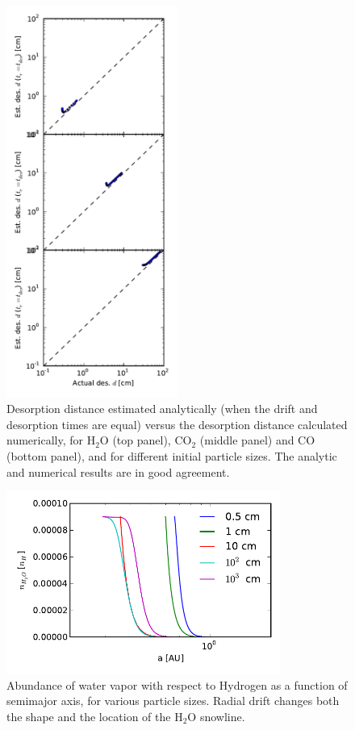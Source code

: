 \documentclass[12pt, preprint]{aastex}
\begin{document}
\begin{figure}[htb]
\centering
\includegraphics[width=0.5\textwidth]{figs/desorption_distance_actual_vs_estimated.pdf}
\caption{Desorption distance estimated analytically (when the drift and desorption times are equal) versus the desorption distance calculated numerically, for H$_2$O (top panel), CO$_2$ (middle panel) and CO (bottom panel), and for different initial particle sizes. The analytic and numerical results are in good agreement.} %
\label{fig:an_vs_num}
\end{figure}

\begin{figure}[htb]
\centering
\includegraphics[width=0.8\textwidth]{figs/nH2O_no_acc.pdf}
\caption{Abundance of water vapor with respect to Hydrogen as a function of semimajor axis, for various particle sizes. Radial drift changes both the shape and the location of the H$_2$O snowline.} %
\label{fig:nwater_drift}
\end{figure}
\end{document}
